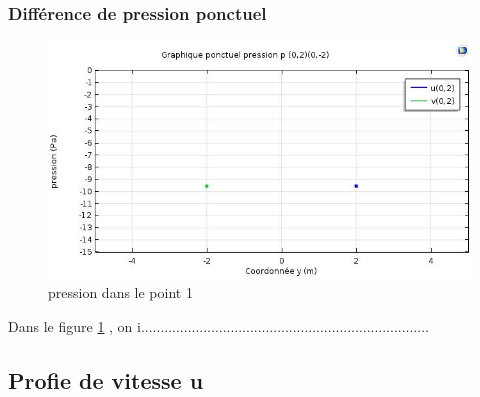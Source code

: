 \documentclass[a4paper,11pt]{report} %
\begin{document}
\subsubsection{Différence de pression ponctuel}
\begin{figure}[!h]
\centering
\hspace*{0mm}\vfill
\begin{center} \includegraphics[width=1.\textwidth]{pression_ponctuel.jpg} \end{center}
\vfill\hspace*{0mm}
\caption{pression dans le point 1 }
\label{pression_ponctuel1}
\end{figure}\pagebreak
Dans le figure \ref{pression_ponctuel1} , on i..........................................................................






\subsection{Profie de vitesse u}
\end{document}
